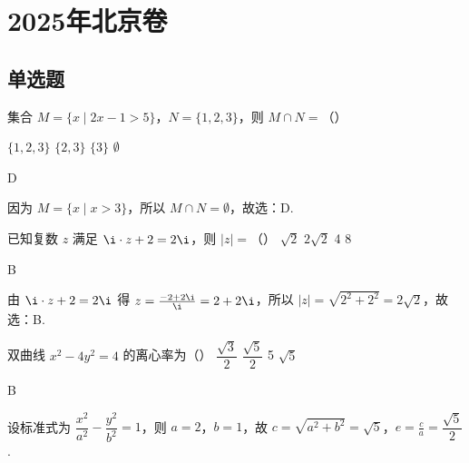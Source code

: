 \documentclass[UTF8,a4paper,oneside,11pt]{ctexbook}
\begin{document}
\mainmatter

\chapter{2025年北京卷}
\section{单选题}

\begin{problem}
集合 \(M = \{x\mid 2x - 1 > 5\}\)，\(N=\{1,2,3\}\)，则 \(M\cap N=\)（\quad）

\choices
    {\(\{1,2,3\}\)}
    {\(\{2,3\}\)}
    {\(\{3\}\)}
    {\(\emptyset\)}
\end{problem}

\begin{answer}
D
\end{answer}

\begin{solution}
因为 \(M = \{x\mid x > 3\}\)，所以 \(M\cap N=\emptyset\)，故选：D.
\end{solution}

\begin{problem}
已知复数 \(z\) 满足 \(\i\cdot z +2 = 2\i\)，则 \(|z| =\)（\quad）
\choices
    {\(\sqrt{2}\)}
    {\(2\sqrt{2}\)}
    {4}
    {8}
\end{problem}

\begin{answer}
B
\end{answer}

\begin{solution}
由 \(\i\cdot z +2 = 2\i\) 得 \(z=\frac{-2+2\i}{\i}=2+2\i\)，所以 \(|z|=\sqrt{2^2+2^2}=2\sqrt{2}\)，故选：B.
\end{solution}

\begin{problem}
双曲线 \(x^2-4y^2=4\) 的离心率为（\quad）
\choices
    {\(\dfrac{\sqrt{3}}{2}\)}
    {\(\dfrac{\sqrt{5}}{2}\)}
    {5}
    {\(\sqrt{5}\)}
\end{problem}

\begin{answer}
B
\end{answer}

\begin{solution}
设标准式为 \(\dfrac{x^2}{a^2}-\dfrac{y^2}{b^2}=1\)，则 \(a=2\)，\(b=1\)，故 \(c=\sqrt{a^2+b^2}=\sqrt{5}\)，\(e=\frac{c}{a}=\dfrac{\sqrt{5}}{2}\).
\end{solution}
\end{document}
